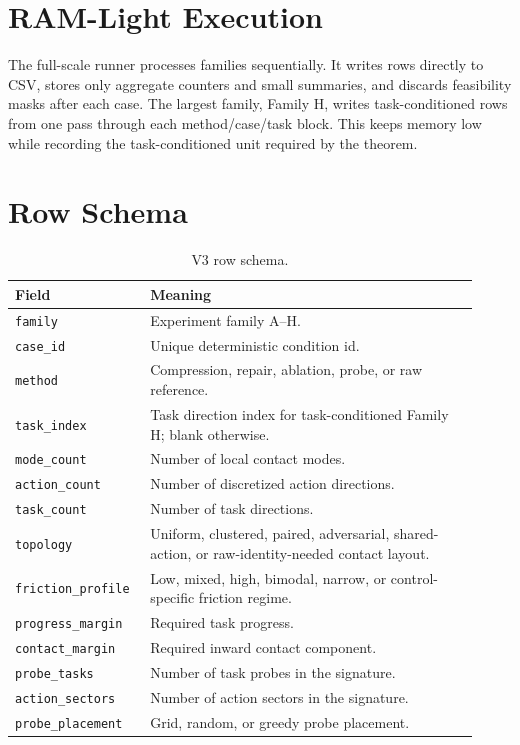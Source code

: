 \documentclass{article}
\begin{document}
\section{RAM-Light Execution}
The full-scale runner processes families sequentially. It writes rows directly to CSV, stores only aggregate counters and small summaries, and discards feasibility masks after each case. The largest family, Family H, writes task-conditioned rows from one pass through each method/case/task block. This keeps memory low while recording the task-conditioned unit required by the theorem.

\section{Row Schema}
\begin{table}[p]
\centering
\caption{V3 row schema.}
\label{tab:row-schema}
\scriptsize
\begin{tabular}{p{0.25\linewidth}p{0.67\linewidth}}
\toprule
Field & Meaning\\
\midrule
\texttt{family} & Experiment family A--H.\\
\texttt{case\_id} & Unique deterministic condition id.\\
\texttt{method} & Compression, repair, ablation, probe, or raw reference.\\
\texttt{task\_index} & Task direction index for task-conditioned Family H; blank otherwise.\\
\texttt{mode\_count} & Number of local contact modes.\\
\texttt{action\_count} & Number of discretized action directions.\\
\texttt{task\_count} & Number of task directions.\\
\texttt{topology} & Uniform, clustered, paired, adversarial, shared-action, or raw-identity-needed contact layout.\\
\texttt{friction\_profile} & Low, mixed, high, bimodal, narrow, or control-specific friction regime.\\
\texttt{progress\_margin} & Required task progress.\\
\texttt{contact\_margin} & Required inward contact component.\\
\texttt{probe\_tasks} & Number of task probes in the signature.\\
\texttt{action\_sectors} & Number of action sectors in the signature.\\
\texttt{probe\_placement} & Grid, random, or greedy probe placement.\\

\end{tabular}
\end{table}
\end{document}
